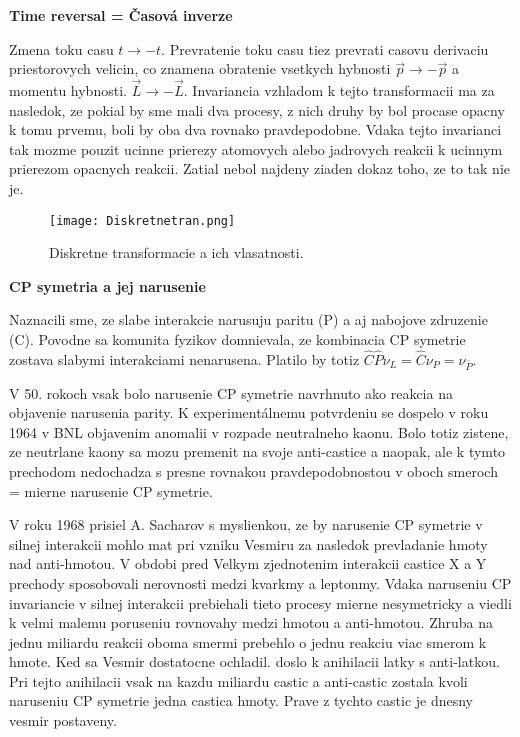 \documentclass[../../main.tex]{subfiles}
\begin{document}
\textbf{Time reversal = Časová inverze}\par
Zmena toku casu $t\rightarrow -t$. Prevratenie toku casu tiez prevrati casovu derivaciu priestorovych velicin, co znamena obratenie vsetkych hybnosti $\vec{p} \rightarrow -\vec{p}$ a momentu hybnosti. $\vec{L} \rightarrow -\vec{L}$. Invariancia vzhladom k tejto transformacii ma za nasledok, ze pokial by sme mali dva procesy, z nich druhy by bol procase opacny k tomu prvemu, boli by oba dva rovnako pravdepodobne. Vdaka tejto invarianci tak mozme pouzit ucinne prierezy atomovych alebo jadrovych reakcii k ucinnym prierezom opacnych reakcii. Zatial nebol najdeny ziaden dokaz toho, ze to tak nie je. 
\begin{figure}[!h]
\centering
\texttt{[image: Diskretnetran.png]}
\caption{Diskretne transformacie a ich vlasatnosti.}
\label{sf1:fig:Diskretnetran}
\end{figure}
\newline
\textbf{CP symetria a jej narusenie}\par
Naznacili sme, ze slabe interakcie narusuju paritu (P) a aj nabojove zdruzenie (C). Povodne sa komunita fyzikov domnievala, ze kombinacia CP symetrie zostava slabymi interakciami nenarusena. Platilo by totiz $\hat{C}\hat{P}\nu_{L}=\hat{C}\nu_P=\nu_{\bar{P}}$.\par
V 50. rokoch vsak bolo narusenie CP symetrie navrhnuto ako reakcia na objavenie narusenia parity. 
K experimentálnemu potvrdeniu se dospelo v roku 1964 v BNL objavenim anomalii v rozpade neutralneho kaonu. Bolo totiz zistene, ze neutrlane kaony sa mozu premenit na svoje anti-castice a naopak, ale k tymto prechodom nedochadza s presne rovnakou pravdepodobnostou v oboch smeroch = mierne narusenie CP symetrie.\par
V roku 1968 prisiel A. Sacharov s myslienkou, ze by narusenie CP symetrie v silnej interakcii mohlo mat pri vzniku Vesmiru za nasledok prevladanie hmoty nad anti-hmotou. V obdobi pred Velkym zjednotenim interakcii castice X a Y prechody sposobovali nerovnosti medzi kvarkmy a leptonmy. Vdaka naruseniu CP invariancie v silnej interakcii prebiehali tieto procesy mierne nesymetricky a viedli  k velmi malemu poruseniu rovnovahy medzi hmotou a anti-hmotou. Zhruba na jednu miliardu reakcii oboma smermi prebehlo o jednu reakciu viac smerom k hmote. Ked sa Vesmir dostatocne ochladil. doslo k anihilacii latky s anti-latkou. Pri tejto anihilacii vsak na kazdu miliardu castic a anti-castic zostala kvoli naruseniu CP symetrie jedna castica hmoty. Prave z tychto castic je dnesny vesmir postaveny.\par
\end{document}
